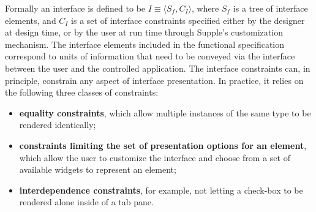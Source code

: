 Formally an interface is defined to be $I \equiv \langle S_{f}, C_{I} \rangle $, where $S_{f}$ is a tree of interface elements, and $C_{I}$ is a set of interface constraints specified either by the designer at design time, or by the user at run time through Supple's customization mechanism. The interface elements included in the functional specification correspond to units of information that need to be conveyed via the interface between the user and the controlled application. The interface constraints can, in principle, constrain any aspect of interface presentation. In practice, it relies on the following three classes of constraints:
\begin{itemize}
\item \textbf{equality constraints}, which allow multiple instances of the same type to be rendered identically;

\item \textbf{constraints limiting the set of presentation options for an element}, which allow the user to customize the interface and choose from a set of available widgets to represent an element;

\item \textbf{interdependence constraints}, for example, not letting a check-box to be rendered alone inside of a tab pane.
\end{itemize}

